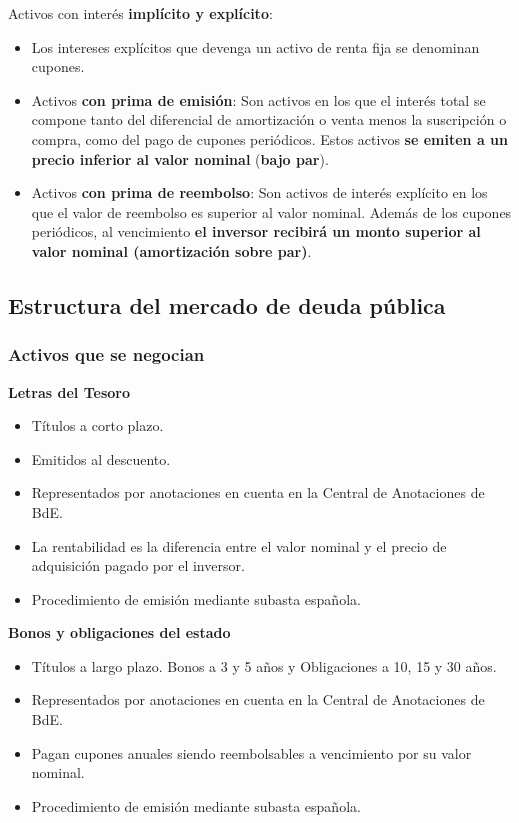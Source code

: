 \documentclass[
  letterpaper,
  DIV=11,
  numbers=noendperiod]{scrartcl}
\begin{document}
Activos con interés \textbf{implícito y explícito}:

\begin{itemize}
\item
  Los intereses explícitos que devenga un activo de renta fija se
  denominan cupones.
\item
  Activos \textbf{con prima de emisión}: Son activos en los que el
  interés total se compone tanto del diferencial de amortización o venta
  menos la suscripción o compra, como del pago de cupones periódicos.
  Estos activos \textbf{se emiten a un precio inferior al valor nominal}
  (\textbf{bajo par}).
\item
  Activos \textbf{con prima de reembolso}: Son activos de interés
  explícito en los que el valor de reembolso es superior al valor
  nominal. Además de los cupones periódicos, al vencimiento \textbf{el
  inversor recibirá un monto superior al valor nominal (amortización
  sobre par)}.
\end{itemize}

\hypertarget{estructura-del-mercado-de-deuda-puxfablica}{%
\subsection{Estructura del mercado de deuda
pública}\label{estructura-del-mercado-de-deuda-puxfablica}}

\hypertarget{activos-que-se-negocian}{%
\subsubsection{Activos que se negocian}\label{activos-que-se-negocian}}

\textbf{Letras del Tesoro}

\begin{itemize}
\item
  Títulos a corto plazo.
\item
  Emitidos al descuento.
\item
  Representados por anotaciones en cuenta en la Central de Anotaciones
  de BdE.
\item
  La rentabilidad es la diferencia entre el valor nominal y el precio de
  adquisición pagado por el inversor.
\item
  Procedimiento de emisión mediante subasta española.
\end{itemize}

\textbf{Bonos y obligaciones del estado}

\begin{itemize}
\item
  Títulos a largo plazo. Bonos a 3 y 5 años y Obligaciones a 10, 15 y 30
  años.
\item
  Representados por anotaciones en cuenta en la Central de Anotaciones
  de BdE.
\item
  Pagan cupones anuales siendo reembolsables a vencimiento por su valor
  nominal.
\item
  Procedimiento de emisión mediante subasta española.
\end{itemize}
\end{document}
